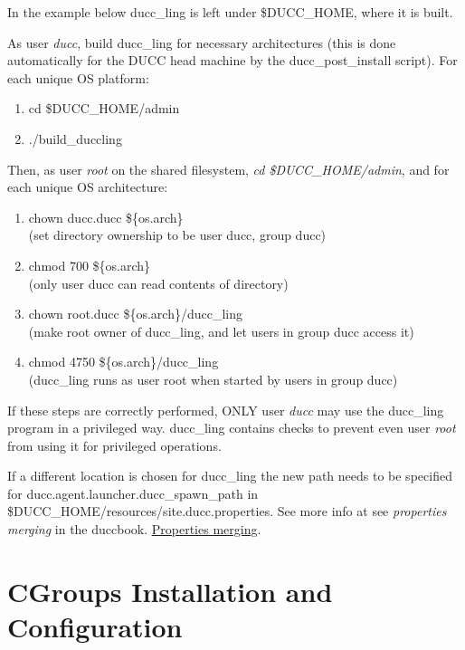     In the example below ducc\_ling is left under \$DUCC\_HOME, where it is built.

    As user {\em ducc}, build ducc\_ling for necessary architectures (this is done
    automatically for the DUCC head machine by the ducc\_post\_install script).
    For each unique OS platform:
    \begin{enumerate}
        \item cd \$DUCC\_HOME/admin
        \item ./build\_duccling
     \end{enumerate}

     Then, as user {\em root} on the shared filesystem, {\em cd \$DUCC\_HOME/admin}, and for each unique OS architecture:
     \begin{enumerate}
        \item chown ducc.ducc \$\{os.arch\}
        \\ (set directory ownership to be user ducc, group ducc)
        \item chmod 700 \$\{os.arch\}
        \\ (only user ducc can read contents of directory)
        \item chown root.ducc \$\{os.arch\}/ducc\_ling
        \\ (make root owner of ducc\_ling, and let users in group ducc access it)
        \item chmod 4750 \$\{os.arch\}/ducc\_ling
        \\ (ducc\_ling runs as user root when started by users in group ducc)
     \end{enumerate}
          
If these steps are correctly performed, ONLY user {\em ducc} may use the ducc\_ling program in
a privileged way. ducc\_ling contains checks to prevent even user {\em root} from using it for
privileged operations.

If a different location is chosen for ducc\_ling the new path needs to be specified 
for ducc.agent.launcher.ducc\_spawn\_path in \$DUCC\_HOME/resources/site.ducc.properties.
See more info at see 
\ifdefined\DUCCSTANDALONE
{\em properties merging} in the duccbook. 
\else
\hyperref[sec:admin.properties-merge] {Properties merging}. 
\fi


\section{CGroups Installation and Configuration}

